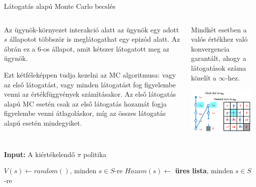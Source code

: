 \documentclass[english, aspectratio=169]{beamer}
\begin{document}
\begin{frame}{Látogatás alapú Monte Carlo becslés}
\begin{columns}
\begin{column}{.5\textwidth}
Az ügynök-környezet interakció alatt az ügynök egy adott $s$ állapotot többször is meglátogathat egy epizód alatt. Az ábrán ez a $6$-os állapot, amit kétszer látogatott meg az ügynök. \par\smallskip 
Ezt kétféleképpen tudja kezelni az MC algoritmusa: vagy az első látogatást, vagy minden látogatást fog figyelembe venni az értékfüggvények számításakor. Az első látogatás alapú MC esetén csak az első látogatás hozamát fogja figyelembe venni átlagoláskor, míg az összes látogatás alapú esetén mindegyiket.
\end{column}
\begin{column}{.5\textwidth}
Mindkét esetben a valós értékhez való konvergencia garantált, ahogy a látogatások száma közelít a $\infty$-hez. 
\begin{center}
\includegraphics[width=7cm, keepaspectratio]{images/mc_td_6.png}
\end{center}
\end{column}
\end{columns}
\end{frame}

\begin{frame}{}
\begin{algorithm}[H]
\caption{Első látogatás alapú Monte Carlo algoritmus $v_{\pi}$ becslésére}
\SetAlgoLined
\textbf{Input:} A kiértékelendő $\pi$ politika\par\smallskip
$V(s) \leftarrow random()$, minden $s \in S$-re\;
$Hozam(s) \leftarrow $ \textbf{üres lista}, minden $s \in S$-re\; 
\end{algorithm}
\end{frame}
\end{document}
